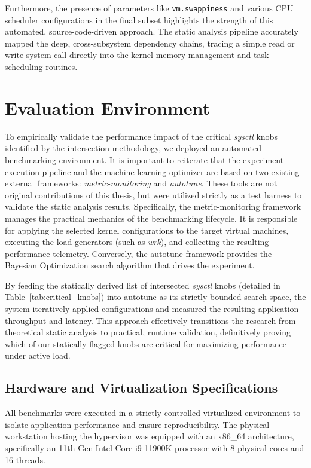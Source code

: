 Furthermore, the presence of parameters like \texttt{vm.swappiness} and various CPU scheduler configurations in the final subset highlights the strength of this automated, source-code-driven approach.
The static analysis pipeline accurately mapped the deep, cross-subsystem dependency chains, tracing a simple read or write system call directly into the kernel memory management and task scheduling routines.

\section{Evaluation Environment}

To empirically validate the performance impact of the critical \textit{sysctl} knobs identified by the intersection methodology, we deployed an automated benchmarking environment.
It is important to reiterate that the experiment execution pipeline and the machine learning optimizer are based on two existing external frameworks: \textit{metric-monitoring} and \textit{autotune}.
These tools are not original contributions of this thesis, but were utilized strictly as a test harness to validate the static analysis results.
Specifically, the metric-monitoring framework manages the practical mechanics of the benchmarking lifecycle.
It is responsible for applying the selected kernel configurations to the target virtual machines, executing the load generators (such as \textit{wrk}), and collecting the resulting performance telemetry.
Conversely, the autotune framework provides the Bayesian Optimization search algorithm that drives the experiment.

By feeding the statically derived list of intersected \textit{sysctl} knobs (detailed in Table~\ref{tab:critical_knobs}) into autotune as its strictly bounded search space, the system iteratively applied configurations and measured the resulting application throughput and latency.
This approach effectively transitions the research from theoretical static analysis to practical, runtime validation, definitively proving which of our statically flagged knobs are critical for maximizing performance under active load.

\subsection{Hardware and Virtualization Specifications}

All benchmarks were executed in a strictly controlled virtualized environment to isolate application performance and ensure reproducibility.
The physical workstation hosting the hypervisor was equipped with an x86\_64 architecture, specifically an 11th Gen Intel Core i9-11900K processor with 8 physical cores and 16 threads.

